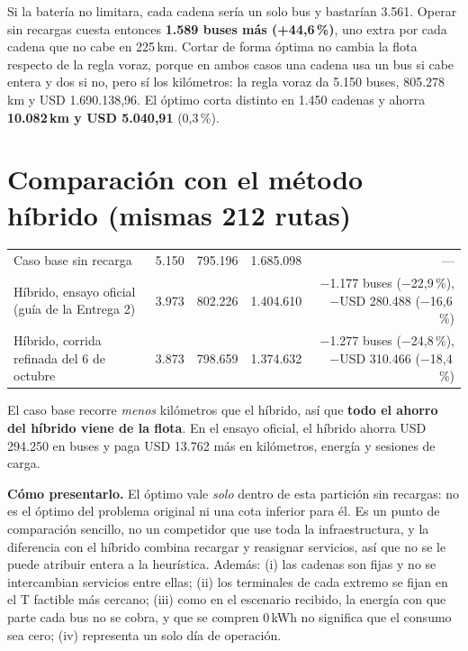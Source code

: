 \documentclass[fontsize=10.5pt,a4paper]{scrartcl}
\newcommand{\hd}[1]{\leavevmode{\sffamily\bfseries\color{ink}#1}}
\begin{document}
Si la batería no limitara, cada cadena sería un solo bus y bastarían 3.561. Operar sin recargas cuesta entonces \textbf{1.589 buses más (+44,6\,\%)}, uno extra por cada cadena que no cabe en 225\,km. Cortar de forma óptima no cambia la flota respecto de la regla voraz, porque en ambos casos una cadena usa un bus si cabe entera y dos si no, pero sí los kilómetros: la regla voraz da 5.150 buses, 805.278\,km y USD 1.690.138,96. El óptimo corta distinto en 1.450 cadenas y ahorra \textbf{10.082\,km y USD 5.040,91} (0,3\,\%).

\section{Comparación con el método híbrido (mismas 212 rutas)}

\begin{center}
\small
\begin{tabularx}{\textwidth}{@{}X r r r r@{}}
\toprule
\hd{Método} & \hd{Buses} & \hd{Km} & \hd{USD/día} & \hd{Diferencia con el caso base} \\
\midrule
Caso base sin recarga & 5.150 & 795.196 & 1.685.098 & --- \\
\rowcolor{softrow} Híbrido, ensayo oficial (guía de la Entrega 2) & 3.973 & 802.226 & 1.404.610 & $-$1.177 buses ($-$22,9\,\%), $-$USD 280.488 ($-$16,6\,\%) \\
Híbrido, corrida refinada del 6 de octubre & 3.873 & 798.659 & 1.374.632 & $-$1.277 buses ($-$24,8\,\%), $-$USD 310.466 ($-$18,4\,\%) \\
\bottomrule
\end{tabularx}
\end{center}

El caso base recorre \emph{menos} kilómetros que el híbrido, así que \textbf{todo el ahorro del híbrido viene de la flota}. En el ensayo oficial, el híbrido ahorra USD 294.250 en buses y paga USD 13.762 más en kilómetros, energía y sesiones de carga.

\begin{clave}
\textbf{Cómo presentarlo.} El óptimo vale \emph{solo} dentro de esta partición sin recargas: no es el óptimo del problema original ni una cota inferior para él. Es un punto de comparación sencillo, no un competidor que use toda la infraestructura, y la diferencia con el híbrido combina recargar y reasignar servicios, así que no se le puede atribuir entera a la heurística. Además: (i) las cadenas son fijas y no se intercambian servicios entre ellas; (ii) los terminales de cada extremo se fijan en el T factible más cercano; (iii) como en el escenario recibido, la energía con que parte cada bus no se cobra, y que se compren 0\,kWh no significa que el consumo sea cero; (iv) representa un solo día de operación.
\end{clave}
\end{document}

